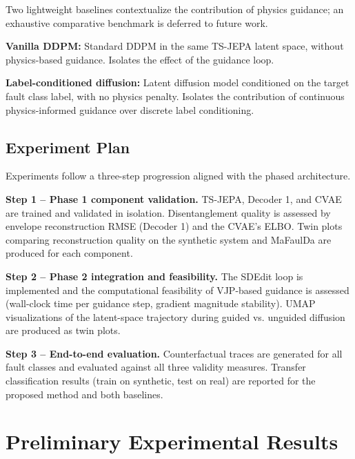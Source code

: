 \documentclass[conference]{IEEEtran}
\begin{document}
Two lightweight baselines contextualize the contribution of physics guidance; an exhaustive comparative benchmark is deferred to future work.

\textbf{Vanilla DDPM:} Standard DDPM in the same TS-JEPA latent space, without physics-based guidance. Isolates the effect of the guidance loop.

\textbf{Label-conditioned diffusion:} Latent diffusion model conditioned on the target fault class label, with no physics penalty. Isolates the contribution of continuous physics-informed guidance over discrete label conditioning.

\subsection{Experiment Plan}

Experiments follow a three-step progression aligned with the phased architecture.

\textbf{Step 1 -- Phase 1 component validation.} TS-JEPA, Decoder 1, and CVAE are trained and validated in isolation. Disentanglement quality is assessed by envelope reconstruction RMSE (Decoder 1) and the CVAE's ELBO. Twin plots comparing reconstruction quality on the synthetic system and MaFaulDa are produced for each component.

\textbf{Step 2 -- Phase 2 integration and feasibility.} The SDEdit loop is implemented and the computational feasibility of VJP-based guidance is assessed (wall-clock time per guidance step, gradient magnitude stability). UMAP visualizations of the latent-space trajectory during guided vs. unguided diffusion are produced as twin plots.

\textbf{Step 3 -- End-to-end evaluation.} Counterfactual traces are generated for all fault classes and evaluated against all three validity measures. Transfer classification results (train on synthetic, test on real) are reported for the proposed method and both baselines.

\section{Preliminary Experimental Results}
\label{sec:results}
\end{document}

